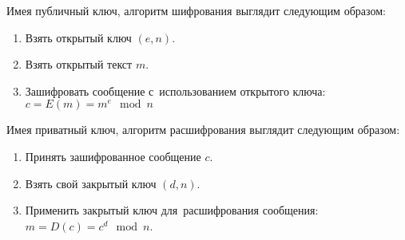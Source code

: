 Имея публичный ключ, алгоритм шифрования выглядит следующим образом:
\begin{enumerate}
	\item Взять открытый ключ \((e,n)\).
	\item Взять открытый текст \(m\).
	\item Зашифровать сообщение с~использованием открытого ключа: \(c=E(m)=m^e \mod n\)
\end{enumerate}

Имея приватный ключ, алгоритм расшифрования выглядит следующим образом:
\begin{enumerate}
	\item Принять зашифрованное сообщение \(c\).
	\item Взять свой закрытый ключ \((d,n)\).
	\item Применить закрытый ключ для~расшифрования сообщения: \(m=D(c)=c^d \mod n\).
\end{enumerate}